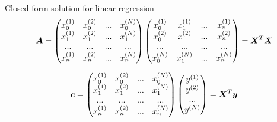 \begin{frame}[t,allowframebreaks]{Closed form solution for linear regression -}
    \begin{equation}
        \boldsymbol{A} =         
        \begin{pmatrix}
            x_0^{(1)} &  x_0^{(2)} & ... & x_0^{(N)} \\
            x_1^{(1)} &  x_1^{(2)} & ... & x_1^{(N)} \\
            ...       &  ...       & ... & ...       \\
            x_n^{(1)} &  x_n^{(2)} & ... & x_n^{(N)} \\
        \end{pmatrix} 
        \begin{pmatrix}
            x_0^{(1)} &  x_1^{(1)} & ... & x_n^{(1)} \\
            x_0^{(2)} &  x_1^{(2)} & ... & x_n^{(2)} \\
            ...       &  ...       & ... & ...       \\
            x_0^{(N)} &  x_1^{(N)} & ... & x_n^{(N)} \\
        \end{pmatrix} =
        \boldsymbol{X}^{T} \boldsymbol{X}
        \label{eq:linear_regression_closed_form_solution_coupled_equations_A_matrix}
    \end{equation}

    \begin{equation}
        \boldsymbol{c} =  
        \begin{pmatrix}
            x_0^{(1)} &  x_0^{(2)} & ... & x_0^{(N)} \\
            x_1^{(1)} &  x_1^{(2)} & ... & x_1^{(N)} \\
            ...       &  ...       & ... & ...       \\
            x_n^{(1)} &  x_n^{(2)} & ... & x_n^{(N)} \\
        \end{pmatrix} 
        \begin{pmatrix}
            y^{(1)} \\
            y^{(2)} \\
            ...      \\
            y^{(N)} \\
        \end{pmatrix} = 
        \boldsymbol{X}^{T} \boldsymbol{y}
        \label{eq:linear_regression_closed_form_solution_coupled_equations_c_matrix}
    \end{equation}

    \framebreak


\end{frame}
